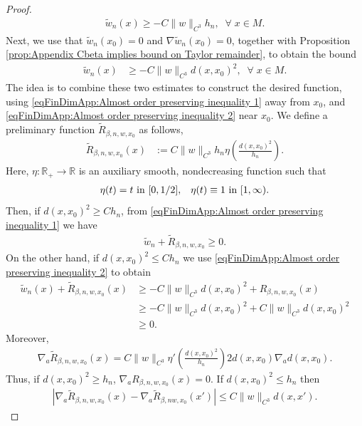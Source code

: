 \documentclass[11pt,reqno]{amsart}
\numberwithin{equation}{section}
\theoremstyle{plain}
\begin{document}
\begin{proof}
\begin{align}
    \tilde w_n(x) \geq -C\|w\|_{C^3}h_n,\;\;\forall\;x\in M.
  \end{align}
  Next, we use that $\tilde w_n(x_0)=0$ and $\nabla \tilde w_n(x_0) = 0$, together with Proposition \ref{prop:Appendix Cbeta implies bound on Taylor remainder}, to obtain the bound  
  \begin{align}\label{eqFinDimApp:Almost order preserving inequality 2}
    \tilde w_n(x) & \geq -C\|w\|_{C^3}d(x,x_0)^2,\;\;\forall\;x\in M.
  \end{align}
  The idea is to combine these two estimates to construct the desired function, using \eqref{eqFinDimApp:Almost order preserving inequality 1} away from $x_0$, and \eqref{eqFinDimApp:Almost order preserving inequality 2} near $x_0$. We define a preliminary function $\tilde R_{\beta,n,w,x_0}$ as follows,
  \begin{align*}
    \tilde R_{\beta,n,w,x_0}(x) & := C\|w\|_{C^3}h_n \eta\left (\frac{d(x,x_0)^2}{h_n} \right ).
  \end{align*}
  Here, $\eta:\mathbb{R}_+\to\mathbb{R}$ is an auxiliary smooth, nondecreasing function such that
  \begin{align*}
    \eta(t) = t \textnormal{ in } [0,1/2],\;\;\;\eta(t) \equiv 1 \textnormal{ in } [1,\infty).
  \end{align*}
  Then, if $d(x,x_0)^2 \geq Ch_n$, from \eqref{eqFinDimApp:Almost order preserving inequality 1} we have
  \begin{align*}
    \tilde w_n +\tilde R_{\beta,n,w,x_0} \geq 0.
  \end{align*}
  On the other hand, if $d(x,x_0)^2 \leq Ch_n$ we use \eqref{eqFinDimApp:Almost order preserving inequality 2} to obtain
  \begin{align*}
    \tilde w_n(x)+\tilde R_{\beta,n,w,x_0}(x) & \geq -C\|w\|_{C^3}d(x,x_0)^2+R_{\beta,n,w,x_0}(x)\\
	  & \geq -C\|w\|_{C^3}d(x,x_0)^2+C\|w\|_{C^3}d(x,x_0)^2\\
	  & \geq 0.
  \end{align*}
  Moreover, 
  \begin{align*}
    \nabla_a \tilde R_{\beta,n,w,x_0}(x) = C\|w\|_{C^3} \eta'\left (\frac{d(x,x_0)^2}{h_n} \right ) 2d(x,x_0)\nabla_a d(x,x_0).
  \end{align*}
  Thus, if $d(x,x_0)^2 \geq h_n$, $\nabla_a R_{\beta,n,w,x_0}(x) =0$. If $d(x,x_0)^2 \leq h_n$ then
  \begin{align*}
    |\nabla_a \tilde R_{\beta,n,w,x_0}(x)-\nabla_a \tilde R_{\beta,nw,x_0}(x')| \leq C\|w\|_{C^3}d(x,x').

\end{align*}
\end{proof}
\end{document}
